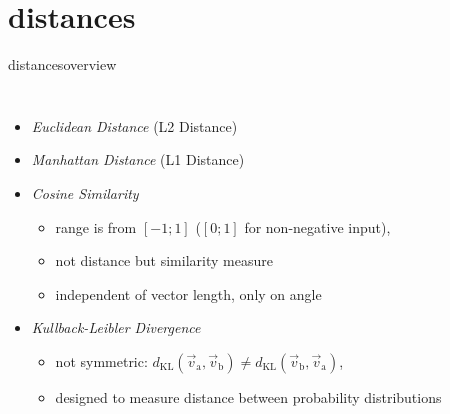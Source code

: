     \section{distances}
        \begin{frame}{distances}{overview }
             \begin{columns}
                    \begin{itemize}
                        \item<1->	\emph{{Euclidean Distance}} (L2 Distance)
                        \item<2->	\emph{{Manhattan Distance}} (L1 Distance)
                        \item<3->	\emph{{Cosine Similarity}}
                                \begin{itemize}
                                    \item   range is from $[-1;1]$ ($[0;1]$ for non-negative input),
                                    \item   not distance but similarity measure
                                    \item   independent of vector length, only on angle
                                \end{itemize}
                        \item<4->	\emph{Kullback-Leibler Divergence}
                                \begin{itemize}
                                    \item   not symmetric: $d_\mathrm{KL}(\vec{v}_\mathrm{a},\vec{v}_\mathrm{b})\neq d_\mathrm{KL}(\vec{v}_\mathrm{b},\vec{v}_\mathrm{a})$,
                                    \item   designed to measure distance between probability distributions
                                \end{itemize}
                            \end{itemize}
\end{columns}
\end{frame}
